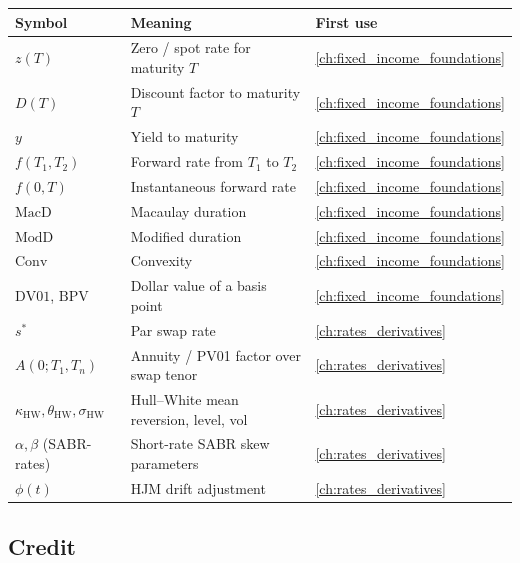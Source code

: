 \begin{longtable}{@{}l >{\raggedright\arraybackslash}p{} l@{}}
\toprule
\textbf{Symbol} & \textbf{Meaning} & \textbf{First use} \\
\midrule
\endhead
$z(T)$ & Zero / spot rate for maturity $T$ & \cref{ch:fixed_income_foundations} \\
$D(T)$ & Discount factor to maturity $T$ & \cref{ch:fixed_income_foundations} \\
$y$ & Yield to maturity & \cref{ch:fixed_income_foundations} \\
$f(T_1, T_2)$ & Forward rate from $T_1$ to $T_2$ & \cref{ch:fixed_income_foundations} \\
$f(0,T)$ & Instantaneous forward rate & \cref{ch:fixed_income_foundations} \\
$\text{MacD}$ & Macaulay duration & \cref{ch:fixed_income_foundations} \\
$\text{ModD}$ & Modified duration & \cref{ch:fixed_income_foundations} \\
$\text{Conv}$ & Convexity & \cref{ch:fixed_income_foundations} \\
$\text{DV01}$, $\text{BPV}$ & Dollar value of a basis point & \cref{ch:fixed_income_foundations} \\
$s^*$ & Par swap rate & \cref{ch:rates_derivatives} \\
$A(0;T_1,T_n)$ & Annuity / PV01 factor over swap tenor & \cref{ch:rates_derivatives} \\
$\kappa_{\text{HW}}, \theta_{\text{HW}}, \sigma_{\text{HW}}$ & Hull--White mean reversion, level, vol & \cref{ch:rates_derivatives} \\
$\alpha, \beta$ (SABR-rates) & Short-rate SABR skew parameters & \cref{ch:rates_derivatives} \\
$\phi(t)$ & HJM drift adjustment & \cref{ch:rates_derivatives} \\
\bottomrule
\end{longtable}

\subsection{Credit}

